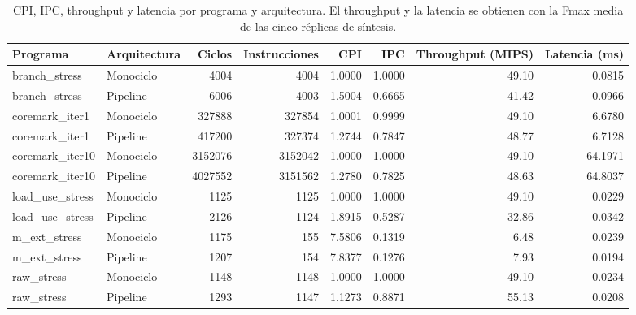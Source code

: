 \begin{table}[htbp]
\centering
\small
\caption{CPI, IPC, throughput y latencia por programa y arquitectura. El throughput y la latencia se obtienen con la Fmax media de las cinco réplicas de síntesis.}
\label{tab:benchmarks}
\begin{tabular}{llrrrrrr}
\toprule
Programa & Arquitectura & Ciclos & Instrucciones & CPI & IPC & Throughput (MIPS) & Latencia (ms) \\
\midrule
branch\_stress & Monociclo & 4004 & 4004 & 1.0000 & 1.0000 & 49.10 & 0.0815 \\
branch\_stress & Pipeline & 6006 & 4003 & 1.5004 & 0.6665 & 41.42 & 0.0966 \\
coremark\_iter1 & Monociclo & 327888 & 327854 & 1.0001 & 0.9999 & 49.10 & 6.6780 \\
coremark\_iter1 & Pipeline & 417200 & 327374 & 1.2744 & 0.7847 & 48.77 & 6.7128 \\
coremark\_iter10 & Monociclo & 3152076 & 3152042 & 1.0000 & 1.0000 & 49.10 & 64.1971 \\
coremark\_iter10 & Pipeline & 4027552 & 3151562 & 1.2780 & 0.7825 & 48.63 & 64.8037 \\
load\_use\_stress & Monociclo & 1125 & 1125 & 1.0000 & 1.0000 & 49.10 & 0.0229 \\
load\_use\_stress & Pipeline & 2126 & 1124 & 1.8915 & 0.5287 & 32.86 & 0.0342 \\
m\_ext\_stress & Monociclo & 1175 & 155 & 7.5806 & 0.1319 & 6.48 & 0.0239 \\
m\_ext\_stress & Pipeline & 1207 & 154 & 7.8377 & 0.1276 & 7.93 & 0.0194 \\
raw\_stress & Monociclo & 1148 & 1148 & 1.0000 & 1.0000 & 49.10 & 0.0234 \\
raw\_stress & Pipeline & 1293 & 1147 & 1.1273 & 0.8871 & 55.13 & 0.0208 \\
\bottomrule
\end{tabular}
\end{table}
